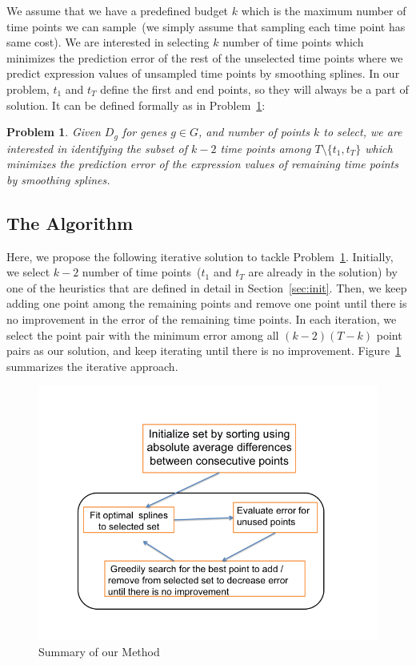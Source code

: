 \documentclass[10pt]{article}
\newtheorem{problem}{Problem}
\begin{document}
We assume that we have a predefined budget $k$ which is the
maximum number of time points we can sample~(we simply
assume that sampling each time point has same cost). We are interested
in selecting $k$ number of time points which minimizes the prediction error
of the rest of the unselected time points where we predict
expression values of unsampled time points by smoothing splines. In
our problem, $t_{1}$ and $t_{T}$ define the first and end points, so
they will always be a part of solution. It can be defined
formally as in Problem~\ref{prob:prob1}:
%
\begin{problem}\label{prob:prob1}
Given $D_{g}$ for genes $g \in G$, and number of points $k$ to select,
we are interested in identifying the subset of $k-2$ time points among
$T \setminus \{t_{1}, t_{T}\}$ which minimizes the prediction error of the expression values of remaining time points by
smoothing splines.
\end{problem}

\subsection{The Algorithm}

Here, we propose the following iterative solution to tackle
Problem~\ref{prob:prob1}. Initially, we select $k-2$ number of time
points~($t_{1}$ and $t_{T}$ are already in the solution) by one of the
heuristics that are defined in detail in Section~\ref{sec:init}. Then,
we keep adding one point among the remaining points 
and remove one point until there is no improvement in the error
of the remaining time points. In each iteration, we select the
point pair with the minimum error among all $(k-2)(T-k)$ point
pairs as our solution, and keep iterating until there is no
improvement. Figure~\ref{fig:algo} summarizes the iterative approach. 

\begin{figure}
\centering
\includegraphics[scale=0.4]{algo.png}
\caption{Summary of our Method}
\label{fig:algo}
\end{figure}
\end{document}
